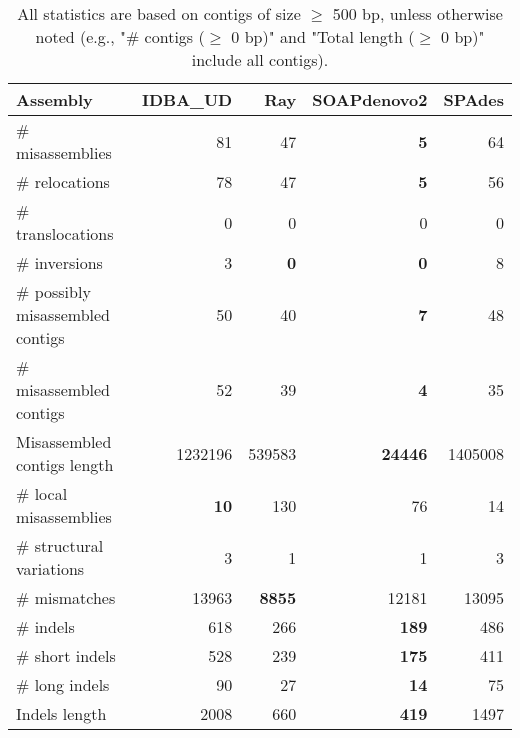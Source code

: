 \documentclass[12pt,a4paper]{article}
\begin{document}
\begin{table}[ht]
\begin{center}
\caption{All statistics are based on contigs of size $\geq$ 500 bp, unless otherwise noted (e.g., "\# contigs ($\geq$ 0 bp)" and "Total length ($\geq$ 0 bp)" include all contigs).}
\begin{tabular}{|l*{4}{|r}|}
\hline
Assembly & IDBA\_UD & Ray & SOAPdenovo2 & SPAdes \\ \hline
\# misassemblies & 81 & 47 & {\bf 5} & 64 \\ \hline
\hspace{5mm}\# relocations & 78 & 47 & {\bf 5} & 56 \\ \hline
\hspace{5mm}\# translocations & 0 & 0 & 0 & 0 \\ \hline
\hspace{5mm}\# inversions & 3 & {\bf 0} & {\bf 0} & 8 \\ \hline
\# possibly misassembled contigs & 50 & 40 & {\bf 7} & 48 \\ \hline
\# misassembled contigs & 52 & 39 & {\bf 4} & 35 \\ \hline
Misassembled contigs length & 1232196 & 539583 & {\bf 24446} & 1405008 \\ \hline
\# local misassemblies & {\bf 10} & 130 & 76 & 14 \\ \hline
\# structural variations & 3 & 1 & 1 & 3 \\ \hline
\# mismatches & 13963 & {\bf 8855} & 12181 & 13095 \\ \hline
\# indels & 618 & 266 & {\bf 189} & 486 \\ \hline
\hspace{5mm}\# short indels & 528 & 239 & {\bf 175} & 411 \\ \hline
\hspace{5mm}\# long indels & 90 & 27 & {\bf 14} & 75 \\ \hline
Indels length & 2008 & 660 & {\bf 419} & 1497 \\ \hline
\end{tabular}
\end{center}
\end{table}
\end{document}
